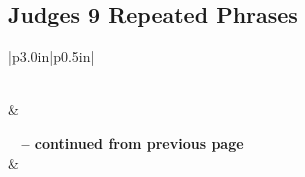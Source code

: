 \subsection{Judges 9 Repeated Phrases}


\normalsize
 
\begin{center}
\begin{longtable}{|p{3.0in}|p{0.5in}|}
\caption[Judges 9 Repeated Phrases]{Judges 9 Repeated Phrases}\label{table:Repeated Phrases Judges 9} \\
\hline {} &  \\ \hline 
\endfirsthead
 
{{\bfseries \tablename\ \thetable{} -- continued from previous page}} \\  
\hline {} &  \\ \hline 
\endhead
 

\end{longtable}
\end{center}
